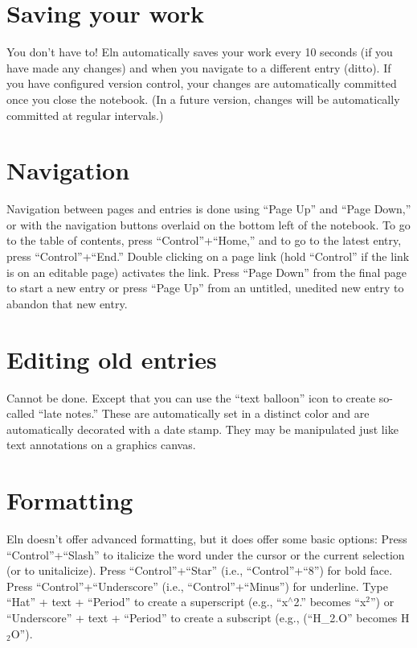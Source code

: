 \documentclass[11pt]{report}
\begin{document}
\section{Saving your work}

You don't have to! Eln automatically saves your work every 10 seconds
(if you have made any changes) and when you navigate to a different
entry (ditto). If you have configured version control, your changes
are automatically committed once you close the notebook. (In a future
version, changes will be automatically committed at regular
intervals.)

\section{Navigation}

Navigation between pages and entries is done using ``Page Up'' and
``Page Down,'' or with the navigation buttons overlaid on the bottom left of
the notebook. To go to the table of contents, press
``Control''+``Home,'' and to go to the latest entry, press
``Control''+``End.'' Double clicking on a page link (hold ``Control''
if the link is on an editable page) activates the link. Press ``Page
Down'' from the final page to start a new entry or press ``Page Up''
from an untitled, unedited new entry to abandon that new entry.

\section{Editing old entries}

Cannot be done. Except that you can use the ``text balloon'' icon to
create so-called ``late notes.'' These are automatically set in a
distinct color and are automatically decorated with a date stamp. They
may be manipulated just like text annotations on a graphics canvas.

\section{Formatting}

Eln doesn't offer advanced formatting, but it does offer some basic
options: Press ``Control''+``Slash'' to italicize the word under the
cursor or the current selection (or to unitalicize). Press
``Control''+``Star'' (i.e., ``Control''+``8'') for bold face. Press
``Control''+``Underscore'' (i.e., ``Control''+``Minus'') for
underline. Type ``Hat'' + text + ``Period'' to create a superscript
(e.g., ``x$^\wedge$2.'' becomes ``x$^2$'') or ``Underscore'' + text +
``Period'' to create a subscript (e.g., (``H\_2.O'' becomes H$_2$O'').
\end{document}

